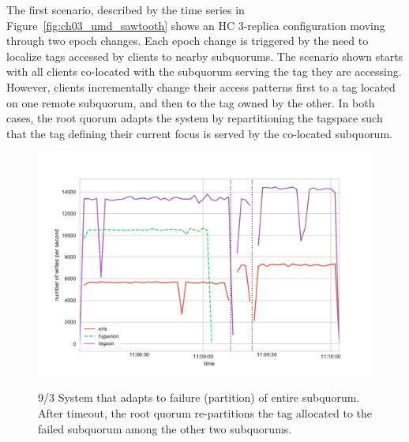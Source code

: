 The first scenario, described by the time series in Figure~\ref{fig:ch03_umd_sawtooth} shows an HC 3-replica configuration moving through two epoch changes.
Each epoch change is triggered by the need to localize tags accessed by
clients to nearby subquorums.
The scenario shown starts with all clients co-located with the subquorum serving the tag they are accessing.
However, clients incrementally change their access patterns first to a tag located on one remote subquorum, and then to the tag owned by the other.
In both cases, the root quorum adapts the system by repartitioning the tagspace such that the tag defining their current focus is served by the co-located subquorum.

\begin{figure}
    \begin{center}
        \includegraphics[width=5in]{figures/ch03_umd_fault_tolerance.pdf}
    \end{center}
    \renewcommand{\baselinestretch}{1}
    \small\normalsize

    \begin{quote}
        \caption[HC Fault Repartitioning]{9/3 System that adapts to failure (partition) of entire subquorum. After timeout, the root quorum re-partitions the tag allocated to the failed subquorum among the other two subquorums.}
        \label{fig:ch03_umd_fault_tolerance}
    \end{quote}
\end{figure}
\renewcommand{\baselinestretch}{2}
\small\normalsize

